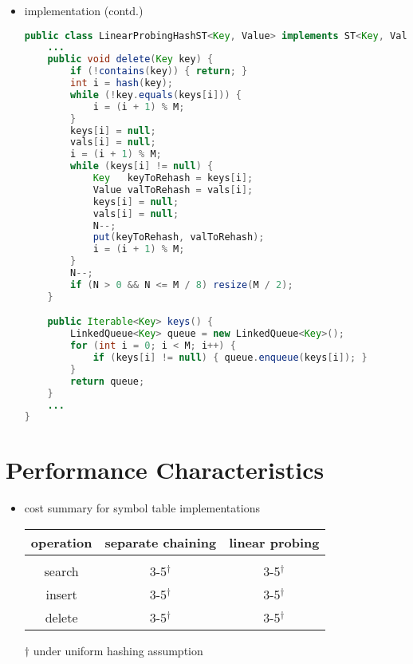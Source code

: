 \documentclass[8pt,a4paper,compress]{beamer}
\begin{document}
\begin{frame}[fragile]
\begin{itemize}
\item implementation (contd.)
\begin{lstlisting}[language=Java]
public class LinearProbingHashST<Key, Value> implements ST<Key, Value> {
    ...
    public void delete(Key key) {
        if (!contains(key)) { return; }
        int i = hash(key);
        while (!key.equals(keys[i])) {
            i = (i + 1) % M;
        }
        keys[i] = null;
        vals[i] = null;
        i = (i + 1) % M;
        while (keys[i] != null) {
            Key   keyToRehash = keys[i];
            Value valToRehash = vals[i];
            keys[i] = null;
            vals[i] = null;
            N--;  
            put(keyToRehash, valToRehash);
            i = (i + 1) % M;
        }
        N--;        
        if (N > 0 && N <= M / 8) resize(M / 2);
    }

    public Iterable<Key> keys() {
        LinkedQueue<Key> queue = new LinkedQueue<Key>();
        for (int i = 0; i < M; i++) {
            if (keys[i] != null) { queue.enqueue(keys[i]); }
        }
        return queue;
    }
    ...
}
\end{lstlisting}
\end{itemize}
\end{frame}

\section{Performance Characteristics}
\begin{frame}[fragile]
\begin{itemize}
\item cost summary for symbol table implementations
\begin{center}
\begin{tabular}{ccc}
\textbf{operation} & \textbf{separate chaining} & \textbf{linear probing} \\ \hline \\
search & 3-5$^\dagger$ & 3-5$^\dagger$ \\
insert & 3-5$^\dagger$ & 3-5$^\dagger$ \\
delete & 3-5$^\dagger$ & 3-5$^\dagger$ \\
\end{tabular}  

\smallskip

\tiny $\dagger$ under uniform hashing assumption
\end{center}
\end{itemize}
\end{frame}
\end{document}
